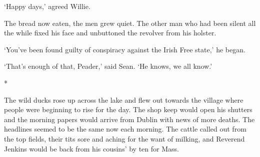 \documentclass[10pt,a4paper]{article}
\begin{document}
‘Happy days,’ agreed Willie.

The bread now eaten, the men grew quiet. The other man who had been silent all the while fixed his face and unbuttoned the revolver from his holster.

‘You’ve been found guilty of conspiracy against the Irish Free state,’ he began.

‘That’s enough of that, Peader,’ said Sean. ‘He knows, we all know.’

\begin{center}*\end{center}

The wild ducks rose up across the lake and flew out towards the village where people were beginning to rise for the day. The shop keep would open his shutters and the morning papers would arrive from Dublin with news of more deaths. The headlines seemed to be the same now each morning. The cattle called out from the top fields, their tits sore and aching for the want of milking, and Reverend Jenkins would be back from his cousins’ by ten for Mass.
\end{document}
